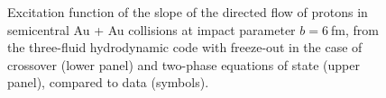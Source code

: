 \documentclass[epj]{svjour}
\begin{document}
\begin{figure}[!hb]
\caption{Excitation function of the slope of the directed flow of protons in semicentral Au + Au 
collisions at impact parameter $b=6~$fm, from the three-fluid hydrodynamic code 
with freeze-out in the case of crossover (lower panel) and two-phase equations of state (upper panel), 
compared to data (symbols).
\label{fig:v1slope}
}
\end{figure}
\end{document}
